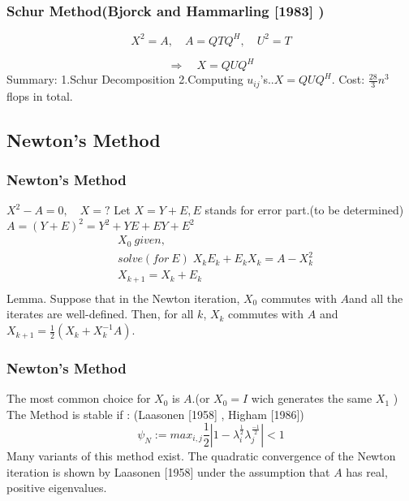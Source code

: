 
\begin{frame}

\frametitle{Schur Method\newline (Bjorck and Hammarling [1983] )}
\[
X^2 =A , \quad A = QTQ^H ,\quad U^2 =T
\]

\[
\Longrightarrow \quad X =QUQ^H
\]
Summary:\newline
1.Schur Decomposition\newline
2.Computing $u_{ij}$'s..$X = QUQ^H $.\newline \newline
Cost: $\frac {28} {3}n^3 $ flops in total.

\end{frame}


\begin{frame}
\subsection{Newton's Method}
\frametitle{Newton's Method}
$X^2-A =0 , \quad X = ?$\newline
Let $X=Y+E ,$\quad $E$ stands for error part.(to be determined)\newline
$A = (Y+E)^2 = Y^2+YE+EY+E^2 $\newline
\begin{align*}
&
X_0 \ given, \\
&
solve(for \ E) \; X_kE_k+E_kX_k = A-X^2 _k \\
& 
X_{k+1}= X_k + E_k\\
\end{align*}
Lemma. Suppose that in the Newton iteration, $X_0$ commutes with $A$\newline and
all the iterates are well-defined. Then, for all $k$,\newline
$X_k$ commutes with $A$ and $X_{k+1} =\frac {1} {2}(X_k + X_k ^{-1}A)$.
\end{frame}


\begin{frame}

\frametitle{Newton's Method}
The most common choice for $X_0$ is $A$.(or $X_0 = I$ wich generates the same $X_1$ )\newline \newline
The Method is stable if : (Laasonen [1958] ,  Higham [1986]) \[\psi_N := max_{i,j} \frac {1} {2} | 1- \lambda _i ^{\frac {1} {2}} \lambda _j ^{\frac {-1} {2}} | < 1 \]\newline
Many variants of this method exist.\newline \newline
The quadratic convergence of the Newton iteration is shown by Laasonen [1958] \newline
under the assumption that $A$ has real, positive eigenvalues.
\end{frame}

